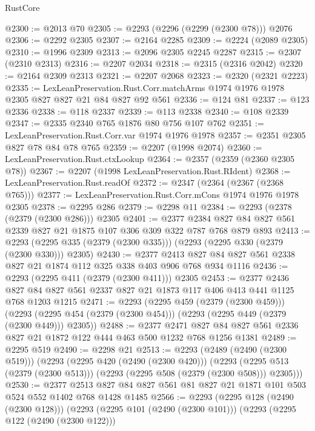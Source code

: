 \begin{lexlean}{RustCore}
\begin{coremodule}
@2300 := @2013 @70
@2305 := @2293 (@2296 (@2299 (@2300 @78))) @2076
@2306 := @2292 @2305
@2307 := @2164 @2285
@2309 := @2224 (@2089 @2305)
@2310 := @1996 @2309
@2313 := @2096 @2305 @2245 @2287
@2315 := @2307 (@2310 @2313)
@2316 := @2207 @2034
@2318 := @2315 (@2316 @2042)
@2320 := @2164 @2309 @2313
@2321 := @2207 @2068
@2323 := @2320 (@2321 @2223)
@2335 := LexLeanPreservation.Rust.Corr.matchArms
    @1974
    @1976
    @1978
    @2305
    @827
    @827
    @21
    @84
    @827
    @92
    @561
@2336 := @124 @81
@2337 := @123 @2336
@2338 := @118 @2337
@2339 := @113 @2338
@2340 := @108 @2339
@2347 := @2335 @2340 @765 @1876 @80 @756 @107 @762
@2351 := LexLeanPreservation.Rust.Corr.var @1974 @1976 @1978
@2357 := @2351 @2305 @827 @78 @84 @78 @765
@2359 := @2207 (@1998 @2074)
@2360 := LexLeanPreservation.Rust.ctxLookup
@2364 := @2357 (@2359 (@2360 @2305 @78))
@2367 := @2207 (@1998 LexLeanPreservation.Rust.RIdent)
@2368 := LexLeanPreservation.Rust.readOf
@2372 := @2347 (@2364 (@2367 (@2368 @765)))
@2377 := LexLeanPreservation.Rust.Corr.mCons @1974 @1976 @1978 @2305
@2378 := @2295 @286
@2379 := @2298 @11
@2384 := @2293 (@2378 (@2379 (@2300 @286))) @2305
@2401 := @2377 @2384 @827 @84 @827 @561 @2339 @827 @21 @1875 @107 @306 @309 @322 @787 @768 @879 @893
@2413 := @2293 (@2295 @335 (@2379 (@2300 @335))) (@2293 (@2295 @330 (@2379 (@2300 @330))) @2305)
@2430 := @2377
    @2413
    @827
    @84
    @827
    @561
    @2338
    @827
    @21
    @1874
    @112
    @325
    @338
    @403
    @906
    @768
    @934
    @1116
@2436 := @2293 (@2295 @411 (@2379 (@2300 @411))) @2305
@2453 := @2377
    @2436
    @827
    @84
    @827
    @561
    @2337
    @827
    @21
    @1873
    @117
    @406
    @413
    @441
    @1125
    @768
    @1203
    @1215
@2471 := @2293
    (@2295 @459 (@2379 (@2300 @459)))
    (@2293 (@2295 @454 (@2379 (@2300 @454))) (@2293 (@2295 @449 (@2379 (@2300 @449))) @2305))
@2488 := @2377
    @2471
    @827
    @84
    @827
    @561
    @2336
    @827
    @21
    @1872
    @122
    @444
    @463
    @500
    @1232
    @768
    @1256
    @1381
@2489 := @2295 @519
@2490 := @2298 @21
@2513 := @2293
    (@2489 (@2490 (@2300 @519)))
    (@2293
      (@2295 @420 (@2490 (@2300 @420)))
      (@2293 (@2295 @513 (@2379 (@2300 @513))) (@2293 (@2295 @508 (@2379 (@2300 @508))) @2305)))
@2530 := @2377
    @2513
    @827
    @84
    @827
    @561
    @81
    @827
    @21
    @1871
    @101
    @503
    @524
    @552
    @1402
    @768
    @1428
    @1485
@2566 := @2293
    (@2295 @128 (@2490 (@2300 @128)))
    (@2293
      (@2295 @101 (@2490 (@2300 @101)))
      (@2293
        (@2295 @122 (@2490 (@2300 @122)))

\end{coremodule}
\end{lexlean}

